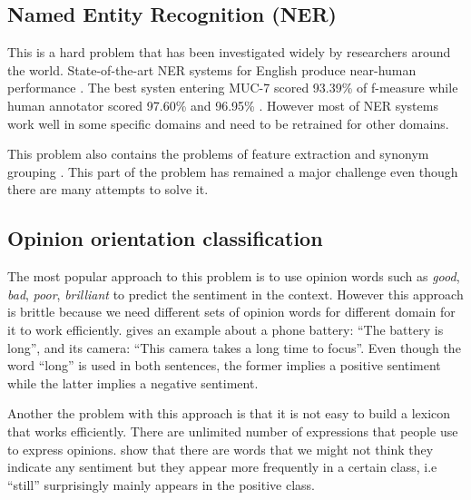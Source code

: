 \documentclass{article}
\begin{document}
\begin{multicols}{2}
  \subsection{Named Entity Recognition (NER)}
    This is a hard problem that has been investigated widely by researchers
around the world. State-of-the-art NER systems for English produce near-human
performance \citet{Wikipedia_NER}. The best systen entering MUC-7 scored 93.39\%
of f-measure while human annotator scored 97.60\% and 96.95\% \citet{Marsh1998}.
However most of NER systems work well in some specific domains and need to be
retrained for other domains.

    This problem also contains the problems of feature extraction and synonym
grouping
\citet{WebKnox2011}. This part of the problem has remained a major challenge
even though there are many attempts to solve it.


  \subsection{Opinion orientation classification}
    The most popular approach to this problem is to use opinion words
such as \textit{good}, \textit{bad}, \textit{poor}, \textit{brilliant} to
predict the sentiment in the context. However this approach is brittle because
we need different sets of opinion words for different domain for it to work
efficiently. \citet{Liu2010} gives an example about a phone battery: ``The
battery is long'', and its camera: ``This camera takes a long time to focus''.
Even though the word ``long'' is used in both sentences, the former implies a
positive sentiment while the latter implies a negative sentiment.

    Another the problem with this approach is that it is not easy to
build a lexicon that works efficiently. There are unlimited number of
expressions that people use to express opinions. \citet{Pang2002} show that
there are words that we might not think they indicate any sentiment but they
appear more frequently in a certain class, i.e ``still'' surprisingly mainly
appears in the positive class.


\end{multicols}
\end{document}
